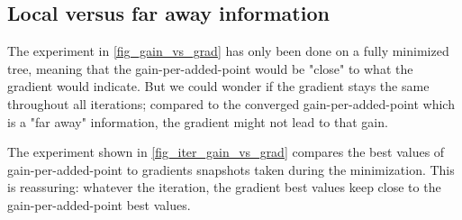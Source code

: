 \subsection{Local versus far away information}

The experiment in \cref{fig_gain_vs_grad} has only been done on a fully minimized tree, meaning that the gain-per-added-point would be "close" to what the gradient would indicate. But we could wonder if the gradient stays the same throughout all iterations; compared to the converged gain-per-added-point which is a "far away" information, the gradient might not lead to that gain.

The experiment shown in \cref{fig_iter_gain_vs_grad} compares the best values of gain-per-added-point to gradients snapshots taken during the minimization. This is reassuring: whatever the iteration, the gradient best values keep close to the gain-per-added-point best values.

